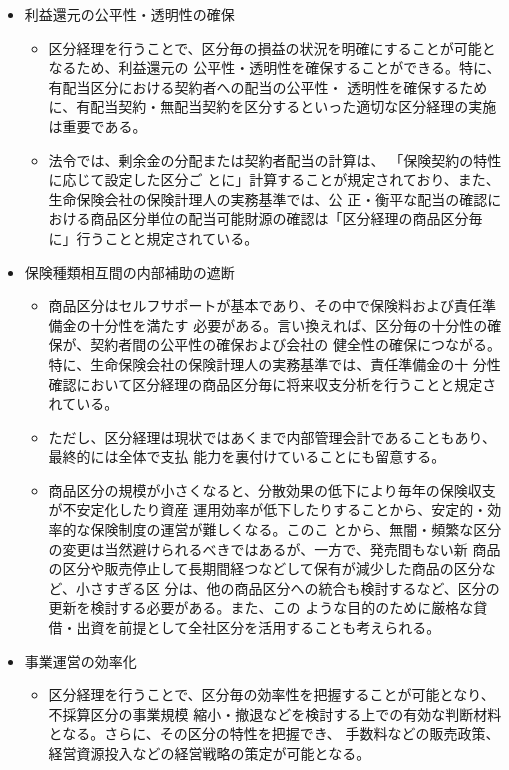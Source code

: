 \documentclass[report,gutter=10mm,fore-edge=10mm,uplatex,dvipdfmx]{jlreq}
\begin{document}
\begin{itemize}
 \item[] 利益還元の公平性・透明性の確保
\begin{itemize}
\item[] 区分経理を行うことで、区分毎の損益の状況を明確にすることが可能となるため、利益還元の
 公平性・透明性を確保することができる。特に、有配当区分における契約者への配当の公平性・
 透明性を確保するために、有配当契約・無配当契約を区分するといった適切な区分経理の実施
 は重要である。
\item[] 法令では、剰余金の分配または契約者配当の計算は、
 「保険契約の特性に応じて設定した区分ご
 とに」計算することが規定されており、また、生命保険会社の保険計理人の実務基準では、公
 正・衡平な配当の確認における商品区分単位の配当可能財源の確認は「区分経理の商品区分毎
 に」行うことと規定されている。
\end{itemize}
 \item[] 保険種類相互間の内部補助の遮断
\begin{itemize}
\item[] 商品区分はセルフサポートが基本であり、その中で保険料および責任準備金の十分性を満たす
 必要がある。言い換えれば、区分毎の十分性の確保が、契約者間の公平性の確保および会社の
 健全性の確保につながる。特に、生命保険会社の保険計理人の実務基準では、責任準備金の十
 分性確認において区分経理の商品区分毎に将来収支分析を行うことと規定されている。
\item[] ただし、区分経理は現状ではあくまで内部管理会計であることもあり、最終的には全体で支払
 能力を裏付けていることにも留意する。
\item[] 商品区分の規模が小さくなると、分散効果の低下により毎年の保険収支が不安定化したり資産
 運用効率が低下したりすることから、安定的・効率的な保険制度の運営が難しくなる。このこ
 とから、無闇・頻繁な区分の変更は当然避けられるべきではあるが、一方で、発売間もない新
 商品の区分や販売停止して長期間経つなどして保有が減少した商品の区分など、小さすぎる区
 分は、他の商品区分への統合も検討するなど、区分の更新を検討する必要がある。また、この
 ような目的のために厳格な貸借・出資を前提として全社区分を活用することも考えられる。
\end{itemize}
 \item[] 事業運営の効率化
\begin{itemize}
\item[] 区分経理を行うことで、区分毎の効率性を把握することが可能となり、不採算区分の事業規模
 縮小・撤退などを検討する上での有効な判断材料となる。さらに、その区分の特性を把握でき、
 手数料などの販売政策、経営資源投入などの経営戦略の策定が可能となる。

\end{itemize}
\end{itemize}
\end{document}
